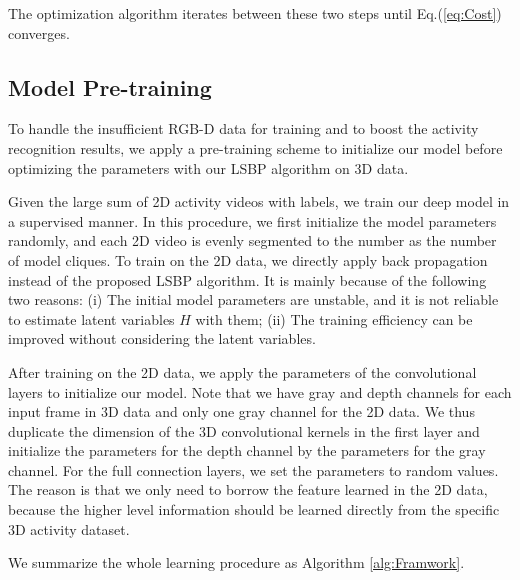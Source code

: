 \documentclass{sig-alternate}
\begin{document}
The optimization algorithm iterates between these two steps until Eq.(\ref{eq:Cost}) converges.


\subsection{Model Pre-training}
To handle the insufficient RGB-D data for training and to boost the activity recognition results, we apply a pre-training scheme to initialize our model before optimizing the parameters with our LSBP algorithm on 3D data.

Given the large sum of 2D activity videos with labels, we train our deep model in a supervised manner. In this procedure, we first initialize the model parameters randomly, and each 2D video is evenly segmented to the number as the number of model cliques. To train on the 2D data, we directly apply back propagation instead of the proposed LSBP algorithm. It is mainly because of the following two reasons: (i) The initial model parameters are unstable, and it is not reliable to estimate latent variables $H$ with them; (ii) The training efficiency can be improved without considering the latent variables.

After training on the 2D data, we apply the parameters of the convolutional layers to initialize our model.  Note that we have gray and depth channels for each input frame in 3D data and only one gray channel for the 2D data. We thus duplicate the dimension of the 3D convolutional kernels in the first layer and initialize the parameters for the depth channel by the parameters for the gray channel. For the full connection layers, we set the parameters to random values. The reason is that we only need to borrow the feature learned in the 2D data, because the higher level information should be learned directly from the specific 3D activity dataset.

We summarize the whole learning procedure as Algorithm \ref{alg:Framwork}.
\end{document}
